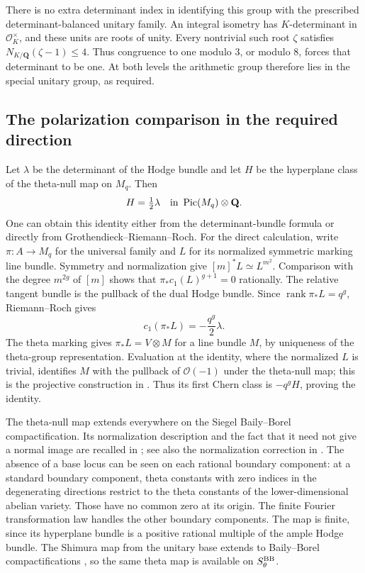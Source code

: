 \documentclass[11pt]{article}
\theoremstyle{definition}
\theoremstyle{remark}
\begin{document}
There is no extra determinant index in identifying this group
with the prescribed determinant-balanced unitary family.
An integral isometry has $K$-determinant in $\mathcal O_K^\times$,
and these units are roots of unity.  Every nontrivial such root
$\zeta$ satisfies $N_{K/\mathbf Q}(\zeta-1)\leq4$.
Thus congruence to one modulo $3$, or modulo $8$, forces that
determinant to be one.  At both levels the arithmetic group
therefore lies in the special unitary group, as required.

\subsection{The polarization comparison in the required direction}

Let $\lambda$ be the determinant of the Hodge bundle and let
$H$ be the hyperplane class of the theta-null map on $M_q$.
Then
\[
 H=\tfrac12\lambda\quad\hbox{in }\operatorname{Pic}(M_q)\otimes\mathbf Q.
\]
One can obtain this identity either from the determinant-bundle
formula or directly from Grothendieck--Riemann--Roch.
For the direct calculation, write $\pi:A\to M_q$ for the
universal family and $L$ for its normalized symmetric marking
line bundle.  Symmetry and normalization give
$[m]^*L\simeq L^{m^2}$.  Comparison with the degree $m^{2g}$
of $[m]$ shows that
$\pi_*c_1(L)^{g+1}=0$ rationally.  The relative tangent bundle
is the pullback of the dual Hodge bundle.  Since
$\operatorname{rank}\pi_*L=q^g$, Riemann--Roch gives
\[
 c_1(\pi_*L)=-\frac{q^g}{2}\lambda.
\]
The theta marking gives $\pi_*L=V\otimes M$ for a line bundle
$M$, by uniqueness of the theta-group representation.
Evaluation at the identity, where the normalized $L$ is trivial,
identifies $M$ with the pullback of $\mathcal O(-1)$ under the
theta-null map; this is the projective construction in
\cite[pp.~80--82]{Mumford1967II}.
Thus its first Chern class is $-q^gH$, proving the identity.

The theta-null map extends everywhere on the Siegel
Baily--Borel compactification.  Its normalization description
and the fact that it need not give a normal image are recalled
in \cite[Introduction, pp.~1--2]{FreitagSalvatiManni2016};
see also the normalization correction in
\cite[\S11, p.~228]{Mumford1967III}.  The absence of a base
locus can be seen on each rational boundary component: at a
standard boundary component, theta constants with zero indices
in the degenerating directions restrict to the theta constants
of the lower-dimensional abelian variety.  Those have no common
zero at its origin.  The finite Fourier transformation law
handles the other boundary components.  The map is finite,
since its hyperplane bundle is a positive rational multiple of
the ample Hodge bundle.  The Shimura map from the unitary base
extends to Baily--Borel compactifications
\cite[\S3.3]{DawJavanpeykarKuhne2020}, so the same theta
map is available on $S_\theta^{\rm BB}$.
\end{document}
